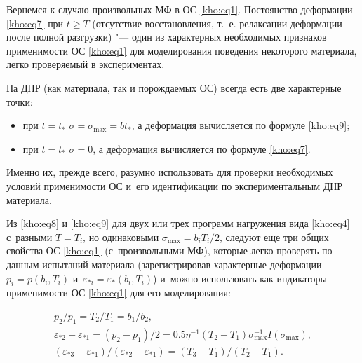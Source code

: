 \smallskip




Вернемся к случаю произвольных МФ в ОС \eqref{kho:eq1}. Постоянство деформации \eqref{kho:eq7} при $t\ge T$ (отсутствие восстановления, т.~е. релаксации деформации после полной разгрузки) "--- один из характерных необходимых признаков применимости ОС \eqref{kho:eq1} для моделирования поведения некоторого материала, легко проверяемый в экспериментах.



На ДНР (как материала, так и порождаемых ОС) всегда есть две характерные точки: 

\begin{itemize}

\item[1)] при $t=t_\ast$ $\sigma=\sigma_{\max}=bt_\ast$, а деформация вычисляется по формуле \eqref{kho:eq9}; 

\item[2)] при $t=t_\ast$ $\sigma=0$, а деформация вычисляется по формуле \eqref{kho:eq7}. 

\end{itemize}

Именно их, прежде всего, разумно использовать для проверки необходимых условий применимости ОС и~его идентификации по экспериментальным ДНР материала. 

Из \eqref{kho:eq8} и \eqref{kho:eq9} для двух или трех программ нагружения вида \eqref{kho:eq4} с~разными $T=T_i$, но одинаковыми $\sigma_{\max}=b_i T_i/2$, следуют еще три общих свойства ОС \eqref{kho:eq1} (с~произвольными МФ), которые легко проверять по данным испытаний материала (зарегистрировав характерные деформации $p_i=p(b_i,T_i)$ и~$\varepsilon_{\ast i}=\varepsilon_\ast(b_i,T_i)$) и~можно использовать как индикаторы применимости ОС \eqref{kho:eq1} для его моделирования:

\begin{gather}

p_2/p_1=T_2/T_1=b_1/b_2,

\\

\label{kho:eq33}

\varepsilon_{\ast2}-\varepsilon_{\ast1}=(p_2-p_1)/2=0.5\eta^{-1}(T_2-T_1)\sigma_{\max}^{-1}I(\sigma_{\max}),

\\

(\varepsilon_{\ast3}-\varepsilon_{\ast1})/(\varepsilon_{\ast2}-\varepsilon_{\ast1})=(T_3-T_1)/(T_2-T_1).

\end{gather}

